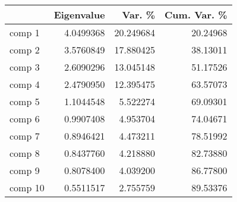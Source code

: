 
\begin{tabular}[t]{lrrr}
\toprule
  & Eigenvalue & Var. \% & Cum. Var. \%\\
\midrule
comp 1 & 4.0499368 & 20.249684 & 20.24968\\
comp 2 & 3.5760849 & 17.880425 & 38.13011\\
comp 3 & 2.6090296 & 13.045148 & 51.17526\\
comp 4 & 2.4790950 & 12.395475 & 63.57073\\
comp 5 & 1.1044548 & 5.522274 & 69.09301\\
\addlinespace
comp 6 & 0.9907408 & 4.953704 & 74.04671\\
comp 7 & 0.8946421 & 4.473211 & 78.51992\\
comp 8 & 0.8437760 & 4.218880 & 82.73880\\
comp 9 & 0.8078400 & 4.039200 & 86.77800\\
comp 10 & 0.5511517 & 2.755759 & 89.53376\\
\bottomrule
\end{tabular}